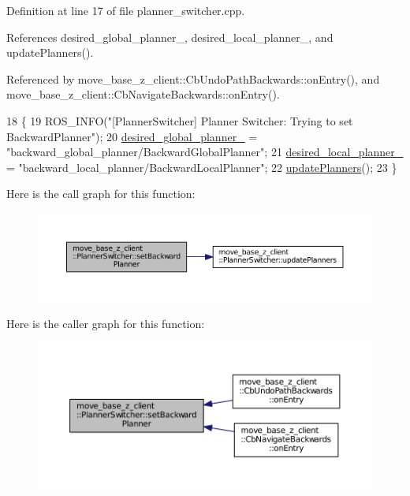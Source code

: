 Definition at line 17 of file planner\+\_\+switcher.\+cpp.



References desired\+\_\+global\+\_\+planner\+\_\+, desired\+\_\+local\+\_\+planner\+\_\+, and update\+Planners().



Referenced by move\+\_\+base\+\_\+z\+\_\+client\+::\+Cb\+Undo\+Path\+Backwards\+::on\+Entry(), and move\+\_\+base\+\_\+z\+\_\+client\+::\+Cb\+Navigate\+Backwards\+::on\+Entry().


\begin{DoxyCode}
18 \{
19   ROS\_INFO(\textcolor{stringliteral}{"[PlannerSwitcher] Planner Switcher: Trying to set BackwardPlanner"});
20   \hyperlink{classmove__base__z__client_1_1PlannerSwitcher_a004c15858f0a6b9abcd8211d58a7e34c}{desired\_global\_planner\_} = \textcolor{stringliteral}{"backward\_global\_planner/BackwardGlobalPlanner"};
21   \hyperlink{classmove__base__z__client_1_1PlannerSwitcher_ae47bd6c9c70b27cddcb394f26bb9372d}{desired\_local\_planner\_} = \textcolor{stringliteral}{"backward\_local\_planner/BackwardLocalPlanner"};
22   \hyperlink{classmove__base__z__client_1_1PlannerSwitcher_a189ac8c027169a111c7d8e14d864752f}{updatePlanners}();
23 \}
\end{DoxyCode}


Here is the call graph for this function\+:
\nopagebreak
\begin{figure}[H]
\begin{center}
\leavevmode
\includegraphics[width=350pt]{classmove__base__z__client_1_1PlannerSwitcher_a7688616d66fbfe6486c0cbe77e688114_cgraph}
\end{center}
\end{figure}




Here is the caller graph for this function\+:
\nopagebreak
\begin{figure}[H]
\begin{center}
\leavevmode
\includegraphics[width=350pt]{classmove__base__z__client_1_1PlannerSwitcher_a7688616d66fbfe6486c0cbe77e688114_icgraph}
\end{center}
\end{figure}


